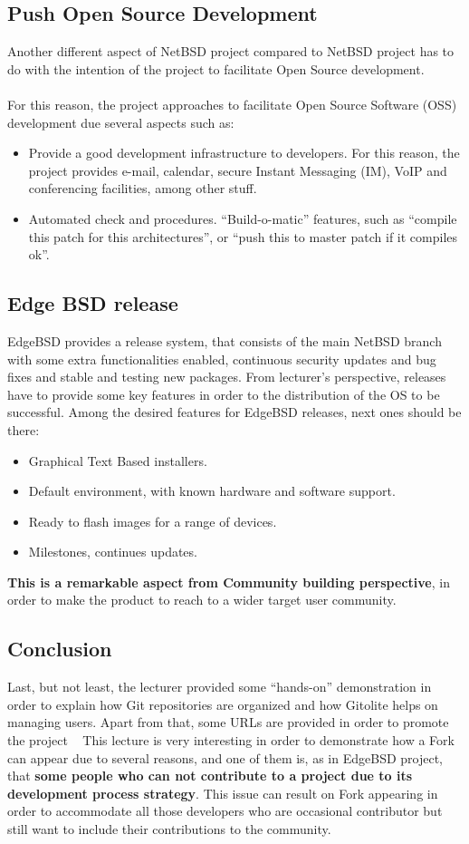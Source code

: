 \documentclass[11pt]{article}
\begin{document}
\subsection{Push Open Source Development}
Another different aspect of NetBSD project compared to NetBSD project has to do with the intention of the project to facilitate Open Source development.\\
\\
For this reason, the project approaches to facilitate Open Source Software (OSS) development due several aspects such as:
\begin{itemize}
\item{Provide a good development infrastructure to developers}. For this reason, the project provides e-mail, calendar, secure Instant Messaging (IM), VoIP and conferencing facilities, among other stuff.
\item{Automated check and procedures}. ``Build-o-matic'' features, such as ``compile this patch for this architectures'', or ``push this to master patch if it compiles ok''.
\end{itemize}

\subsection{Edge BSD release}
EdgeBSD provides a release system, that consists of the main NetBSD branch with some extra functionalities enabled, continuous security updates and bug fixes and stable and testing new packages.
From lecturer's perspective, releases have to provide some key features in order to the distribution of the OS to be successful. Among the desired features for EdgeBSD releases, next ones should be there:
\begin{itemize}
\item{Graphical Text Based installers}.
\item{Default environment, with known hardware and software support}.
\item{Ready to flash images for a range of devices}.
\item{Milestones, continues updates}.
\end{itemize}
\textbf{This is a remarkable aspect from Community building perspective}, in order to make the product to reach to a wider target user community.

\subsection{Conclusion}
Last, but not least, the lecturer provided some ``hands-on'' demonstration in order to explain how Git repositories are organized and how Gitolite helps on managing users. Apart from that, some URLs are provided in order to promote the project ~\cite{EDGE00}
This lecture is very interesting in order to demonstrate how a Fork can appear due to several reasons, and one of them is, as in EdgeBSD project, that \textbf{some people who can not contribute to a project due to its development process strategy}. This issue can result on Fork appearing in order to accommodate all those developers who are occasional contributor but still want to include their contributions to the community.
\end{document}
